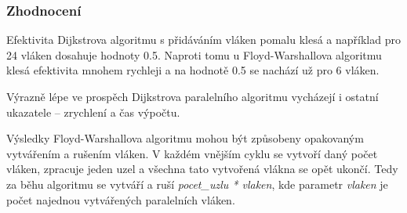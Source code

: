 \subsubsection{Zhodnocení}
Efektivita Dijkstrova algoritmu s přidáváním vláken pomalu klesá a například pro 24 vláken dosahuje hodnoty 0.5. Naproti tomu u Floyd-Warshallova algoritmu klesá efektivita mnohem rychleji a na hodnotě 0.5 se nachází už pro 6 vláken. 

Výrazně lépe ve prospěch Dijkstrova paralelního algoritmu vycházejí i ostatní ukazatele -- zrychlení a čas výpočtu.

Výsledky Floyd-Warshallova algoritmu mohou být způsobeny opakovaným vytvářením a rušením vláken. V každém vnějším cyklu se vytvoří daný počet vláken, zpracuje jeden uzel a všechna tato vytvořená vlákna se opět ukončí. Tedy za běhu algoritmu se vytváří a ruší \textit{pocet\_uzlu * vlaken}, kde parametr \textit{vlaken} je počet najednou vytvářených paralelních vláken.


